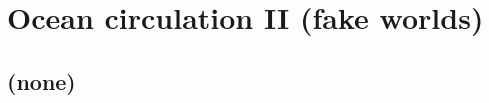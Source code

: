 
\cleardoublepage


\chapter{Ocean circulation II (fake worlds)}\label{ch:ocean-circulation-II}

\hfill \break

\newpage

\section{(none)}

